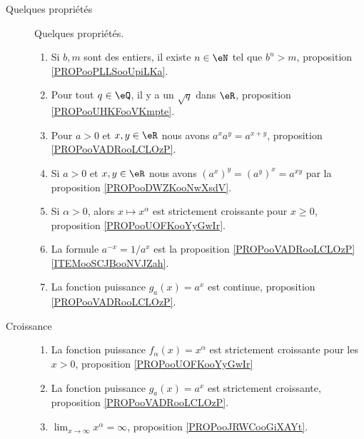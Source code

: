 \begin{description}
	\item[Quelques propriétés]
		Quelques propriétés.
		\begin{enumerate}
			\item
			      Si \( b,m\) sont des entiers, il existe \( n\in \eN\) tel que \( b^n>m\), proposition \ref{PROPooPLLSooUpiLKa}.
			\item
			      Pour tout \( q\in \eQ\), il y a un \( \sqrt{ q }\) dans \( \eR\), proposition \ref{PROPooUHKFooVKmpte}.
			\item
			      Pour \( a>0\) et \( x,y\in \eR\) nous avons \( a^xa^y=a^{x+y}\), proposition \ref{PROPooVADRooLCLOzP}.
			\item
			      Si \( a>0\) et \( x,y\in \eR\) nous avons \( (a^x)^y=(a^y)^x=a^{xy}\) par la proposition \ref{PROPooDWZKooNwXsdV}.
			\item
			      Si \( \alpha>0\), alors \( x\mapsto x^{\alpha}\) est strictement croissante pour \( x\geq 0\), proposition \ref{PROPooUOFKooYyGwIr}.
			\item
			      La formule \( a^{-x}=1/a^x\) est la proposition \ref{PROPooVADRooLCLOzP}\ref{ITEMooSCJBooNVJZah}.
			\item
			      La fonction puissance \( g_a(x)=a^x\) est continue, proposition \ref{PROPooVADRooLCLOzP}.
		\end{enumerate}
	\item[Croissance]
		\begin{enumerate}
			\item
			      La fonction puissance \( f_{\alpha}(x)=x^{\alpha}\) est strictement croissante pour les \( x>0\), proposition \ref{PROPooUOFKooYyGwIr}
			\item
			      La fonction puissance \( g_a(x)=a^x\) est strictement croissante, proposition \ref{PROPooVADRooLCLOzP}.
			\item
			      \( \lim_{x\to \infty} x^{\alpha}=\infty\), proposition \ref{PROPooJRWCooGiXAYt}.
		\end{enumerate}


\end{description}
